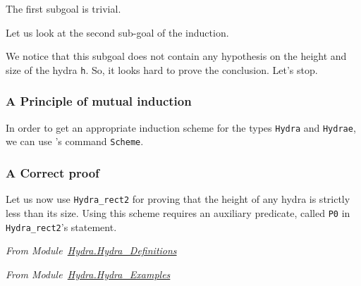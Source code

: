 The first subgoal is trivial.



Let us look at the second sub-goal of the induction.



We notice that this subgoal does not contain any hypothesis
on the height and size of the hydra \texttt{h}. So, it looks hard to prove the conclusion. Let's stop.



\subsubsection{A Principle of mutual induction}
In order to get an appropriate induction scheme for the types 
\texttt{Hydra} and \texttt{Hydrae}, we can use  \coq{}'s  command \texttt{Scheme}.











\subsubsection{A Correct proof}

Let us now use \texttt{Hydra\_rect2} for proving that the height of any hydra is strictly less than its size.
Using this scheme requires an auxiliary predicate, called \texttt{P0} in \texttt{Hydra\_rect2}'s statement. 

\vspace{4pt}
\noindent
\emph{From Module~\href{../theories/html/hydras.Hydra.Hydra_Definitions.html}{Hydra.Hydra\_Definitions}}



\emph{From Module~\href{../theories/html/hydras.Hydra.Hydra_Examples.html}{Hydra.Hydra\_Examples}}





